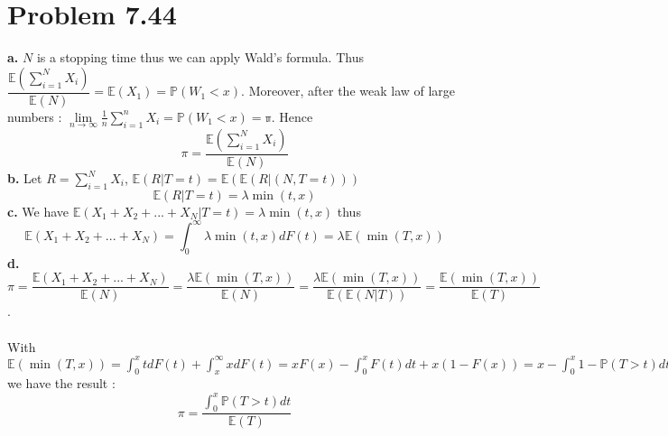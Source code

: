 \documentclass{article}
\begin{document}
\section*{Problem 7.44}
\textbf{a.} $N$ is a stopping time thus we can apply Wald's formula. Thus $\dfrac{\mathbb{E}\left(\sum\limits_{i=1}^NX_i\right)}{\mathbb{E}(N)} = \mathbb{E}(X_1) = \mathbb{P}(W_1<x)$.
Moreover, after the weak law of large numbers : $\lim\limits_{n\to\infty}\frac{1}{n}\sum\limits_{i=1}^nX_i = \mathbb{P}(W_1<x) = \mathbb{\pi}$.
Hence $$\boxed{\pi = \dfrac{\mathbb{E}\left(\sum\limits_{i=1}^NX_i\right)}{\mathbb{E}(N)}}$$
\textbf{b.} Let $R = \sum\limits_{i=1}^N X_i$, $\mathbb{E}(R|T=t) = \mathbb{E}(\mathbb{E}(R|(N,T=t)))$ $$\boxed{\mathbb{E}(R|T=t) = \lambda \min(t,x)}$$
\textbf{c.} We have $\mathbb{E}(X_1+X_2+...+X_N|T=t) = \lambda \min(t,x)$ thus $$\boxed{\mathbb{E}(X_1+X_2+...+X_N) = \int_0^\infty \lambda \min(t,x)dF(t) = \lambda \mathbb{E}(\min(T,x))}$$
\textbf{d.} $\pi = \dfrac{\mathbb{E}(X_1+X_2+...+X_N)}{\mathbb{E}(N)} = \dfrac{\lambda\mathbb{E}(\min(T,x))}{\mathbb{E}(N)} = \dfrac{\lambda\mathbb{E}(\min(T,x))}{\mathbb{E}(\mathbb{E}(N|T))} = \dfrac{\mathbb{E}(\min(T,x))}{\mathbb{E}(T)}$.
\\\\
With $\mathbb{E}(\min(T,x)) = \displaystyle \int_0^x t dF(t) + \displaystyle \int_x^\infty xdF(t) = xF(x)- \int_0^x F(t)dt +x(1-F(x)) = x - \displaystyle \int_0^x 1- \mathbb{P}(T>t)dt = \int_0^x \mathbb{P}(T>t)dt$ we have the result : $$\boxed{\pi =\dfrac{\int_0^x\mathbb{P}(T>t)dt}{\mathbb{E}(T)}}$$
\end{document}
